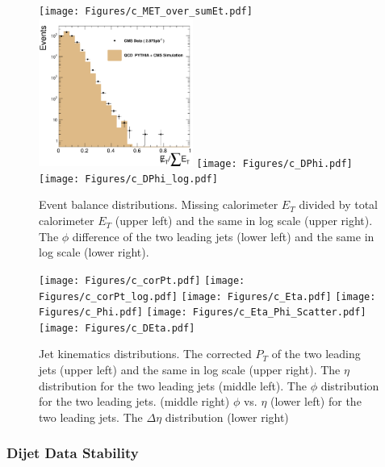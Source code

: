 \begin{figure}[!ht]
  \begin{center}
   \texttt{[image: Figures/c\_MET\_over\_sumEt.pdf]}
   \includegraphics[width=0.45\textwidth]{Figures/c_MET_over_sumEt_log.pdf}
   \texttt{[image: Figures/c\_DPhi.pdf]}
   \texttt{[image: Figures/c\_DPhi\_log.pdf]}

   \caption{ Event balance distributions.  Missing
    calorimeter $E_T$ divided by total calorimeter $E_T$ 
    (upper left) and the same in log scale (upper right).
    The $\phi$ difference of the two leading jets (lower left) 
    and the same in log scale (lower right).}
    \label{basic_event}
  \end{center}
\end{figure}


\begin{figure}[!ht]
  \begin{center}
    \texttt{[image: Figures/c\_corPt.pdf]}
    \texttt{[image: Figures/c\_corPt\_log.pdf]}
    \texttt{[image: Figures/c\_Eta.pdf]}
    \texttt{[image: Figures/c\_Phi.pdf]}
    \texttt{[image: Figures/c\_Eta\_Phi\_Scatter.pdf]}
    \texttt{[image: Figures/c\_DEta.pdf]}

    \caption{ Jet kinematics distributions.  The corrected 
      $P_T$ of the two leading jets (upper left) and the same in log scale
      (upper right). The $\eta$ distribution for the
      two leading jets (middle left). The $\phi$ distribution for the two leading jets. (middle right)
      $\phi$ vs. $\eta$ (lower left) for the two leading jets. The $\Delta\eta$ distribution (lower right) }
    \label{jet_kinematics}
  \end{center}
\end{figure}


\subsubsection{Dijet Data Stability}

